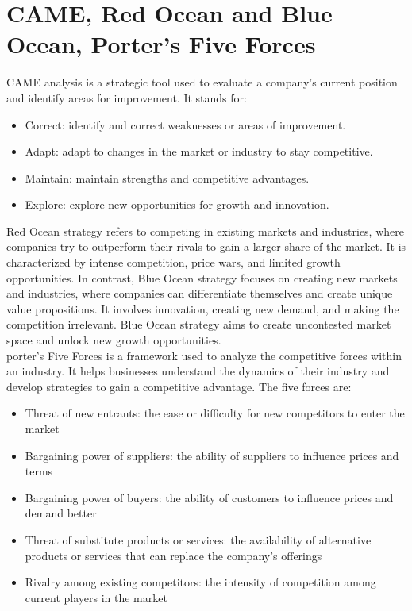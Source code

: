 \documentclass[12pt,a4paper]{report}
\begin{document}
\section{CAME, Red Ocean and Blue Ocean, Porter's Five Forces}
CAME analysis is a strategic tool used to evaluate a company's current position and identify areas for improvement. It stands for:
\begin{itemize}
    \item Correct: identify and correct weaknesses or areas of improvement.
    \item Adapt: adapt to changes in the market or industry to stay competitive.
    \item Maintain: maintain strengths and competitive advantages.
    \item Explore: explore new opportunities for growth and innovation.
\end{itemize}
Red Ocean strategy refers to competing in existing markets and industries, where companies try to outperform their rivals to gain a larger share of the market. It is characterized by intense competition, price wars, and limited growth opportunities. In contrast, Blue Ocean strategy focuses on creating new markets and industries, where companies can differentiate themselves and create unique value propositions. It involves innovation, creating new demand, and making the competition irrelevant. Blue Ocean strategy aims to create uncontested market space and unlock new growth opportunities.
\\
porter's Five Forces is a framework used to analyze the competitive forces within an industry. It helps businesses understand the dynamics of their industry and develop strategies to gain a competitive advantage. The five forces are:
\begin{itemize}
    \item Threat of new entrants: the ease or difficulty for new competitors to enter the market    
    \item Bargaining power of suppliers: the ability of suppliers to influence prices and terms
    \item Bargaining power of buyers: the ability of customers to influence prices and demand better
    \item Threat of substitute products or services: the availability of alternative products or services that can replace the company's offerings
    \item Rivalry among existing competitors: the intensity of competition among current players in the market
\end{itemize}
\end{document}
